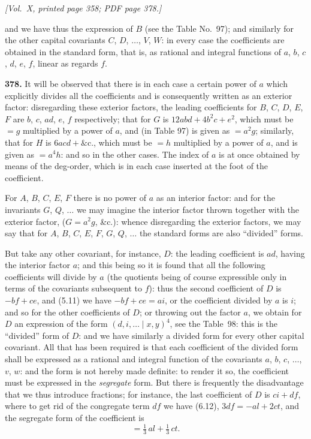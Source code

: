 \documentclass[11pt]{article}
\begin{document}
\newpage

\noindent\textit{[Vol.~X, printed page 358; PDF page 378.]}

\medskip

and we have thus the expression of $B$ (see the Table No.~97); and similarly for the other capital covariants $C$, $D$, $\ldots$, $V$, $W$: in every case the coefficients are obtained in the standard form, that is, as rational and integral functions of $a$, $b$, $c$, $d$, $e$, $f$, linear as regards $f$.

\medskip

\noindent\textbf{378.} It will be observed that there is in each case a certain power of $a$ which explicitly divides all the coefficients and is consequently written as an exterior factor: disregarding these exterior factors, the leading coefficients for $B$, $C$, $D$, $E$, $F$ are $b$, $c$, $ad$, $e$, $f$ respectively; that for $G$ is $12abd+4b^{2}c+e^{2}$, which must be $=g$ multiplied by a power of $a$, and (in Table 97) is given as $=a^{2}g$; similarly, that for $H$ is $6acd+\&\text{c.}$, which must be $=h$ multiplied by a power of $a$, and is given as $=a^{4}h$: and so in the other cases. The index of $a$ is at once obtained by means of the deg-order, which is in each case inserted at the foot of the coefficient.

\medskip

For $A$, $B$, $C$, $E$, $F$ there is no power of $a$ as an interior factor: and for the invariants $G$, $Q$, $\ldots$ we may imagine the interior factor thrown together with the exterior factor, ($G=a^{2}g$, \&c.): whence disregarding the exterior factors, we may say that for $A$, $B$, $C$, $E$, $F$, $G$, $Q$, $\ldots$ the standard forms are also ``divided'' forms.

\medskip

But take any other covariant, for instance, $D$: the leading coefficient is $ad$, having the interior factor $a$; and this being so it is found that all the following coefficients will divide by $a$ (the quotients being of course expressible only in terms of the covariants subsequent to $f$): thus the second coefficient of $D$ is $-bf+ce$, and (5.11) we have $-bf+ce=ai$, or the coefficient divided by $a$ is $i$; and so for the other coefficients of $D$; or throwing out the factor $a$, we obtain for $D$ an expression of the form $(d, i, \ldots \mid x, y)^{4}$, see the Table~98: this is the ``divided'' form of $D$: and we have similarly a divided form for every other capital covariant. All that has been required is that each coefficient of the divided form shall be expressed as a rational and integral function of the covariants $a$, $b$, $c$, $\ldots$, $v$, $w$: and the form is not hereby made definite: to render it so, the coefficient must be expressed in the \emph{segregate} form. But there is frequently the disadvantage that we thus introduce fractions; for instance, the last coefficient of $D$ is $ci+df$, where to get rid of the congregate term $df$ we have (6.12), $3df=-al+2ct$, and the segregate form of the coefficient is
\[
=\tfrac{1}{3}\,al + \tfrac{1}{3}\,ct.
\]
\end{document}
